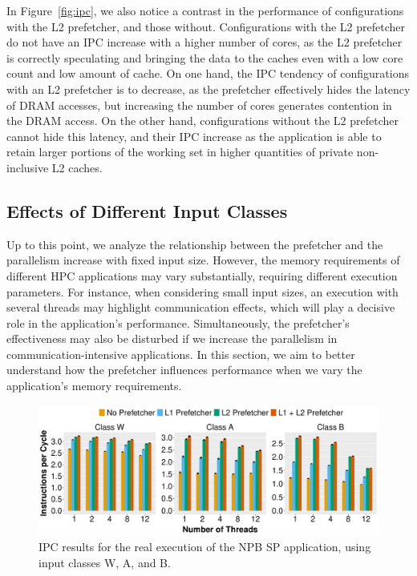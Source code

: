 \documentclass[AMA,final,STIX1COL]{WileyNJD-v2}
\begin{document}
In Figure~\ref{fig:ipc}, we also notice a contrast in the performance of configurations with the L2 prefetcher, and those without.
Configurations with the L2 prefetcher do not have an IPC increase with a higher number of cores, as the L2 prefetcher is correctly speculating and bringing the data to the caches even with a low core count and low amount of cache.
On one hand, the IPC tendency of configurations with an L2 prefetcher is to decrease, as the prefetcher effectively hides the latency of DRAM accesses, but increasing the number of cores generates contention in the DRAM access.
On the other hand, configurations without the L2 prefetcher cannot hide this latency, and their IPC increase as the application is able to retain larger portions of the working set in higher quantities of private non-inclusive L2 caches.



\subsection{Effects of Different Input Classes}
\label{subs:NAS_WAB}

Up to this point, we analyze the relationship between the prefetcher and the parallelism increase with fixed input size.
However, the memory requirements of different HPC applications may vary substantially, requiring different execution parameters. 
For instance, when considering small input sizes, an execution with several threads may highlight communication effects, which will play a decisive role in the application's performance.
Simultaneously, the prefetcher's effectiveness may also be disturbed if we increase the parallelism in communication-intensive applications.
In this section, we aim to better understand how the prefetcher influences performance when we vary the application's memory requirements. 


\begin{figure}[!htb]
    \centering
    \includegraphics[width=.9\linewidth]{figures/ipc-sp-w-a-b-real.pdf}
    \caption{IPC results for the real execution of the NPB SP application, using input classes W, A, and B.}
    \label{fig:nas_wab}
\end{figure}
\end{document}
